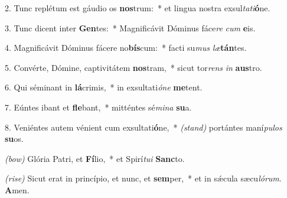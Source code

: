 2. Tunc replétum est gáudio os \textbf{nos}trum:~* et lingua nostra exsul\textit{ta}\textit{ti}\textbf{ó}ne.

3. Tunc dicent inter \textbf{Gen}tes:~* Magnificávit Dóminus fáce\textit{re} \textit{cum} \textbf{e}is.

4. Magnificávit Dóminus fácere no\textbf{bís}cum:~* facti su\textit{mus} \textit{læ}\textbf{tán}tes.

5. Convérte, Dómine, captivitátem \textbf{nos}tram,~* sicut tor\textit{rens} \textit{in} \textbf{aus}tro.

6. Qui séminant in \textbf{lá}crimis,~* in exsultati\textit{ó}\textit{ne} \textbf{me}tent.

7. Eúntes ibant et \textbf{fle}bant,~* mitténtes sé\textit{mi}\textit{na} \textbf{su}a.

8. Veniéntes autem vénient cum exsultati\textbf{ó}ne,~* {\color{red}\textit{(stand)}} portántes maní\textit{pu}\textit{los} \textbf{su}os.

{\color{red}\textit{(bow)}} Glória Patri, et \textbf{Fí}lio,~* et Spirí\textit{tu}\textit{i} \textbf{Sanc}to.

{\color{red}\textit{(rise)}} Sicut erat in princípio, et nunc, et \textbf{sem}per,~* et in s\'{\ae}cula sæcu\textit{ló}\textit{rum}. \textbf{A}men.